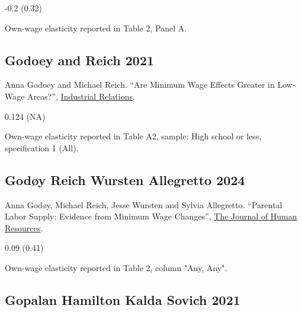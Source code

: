 \vspace{0.7em}

 -0.2 (0.32)

\vspace{0.7em}

 Own-wage elasticity reported in Table 2, Panel A.

\subsection*{Godoey and Reich 2021}
\vspace{-0.7em}

\noindent Anna Godoey and Michael Reich. ``Are Minimum Wage Effects Greater in Low-Wage Areas?'', \href{https://doi.org/10.1111/irel.12267}{Industrial Relations}.

\vspace{0.7em}

 0.124 (NA)

\vspace{0.7em}

 Own-wage elasticity reported in Table A2, sample: High school or less, specification 1 (All).

\subsection*{Godøy Reich Wursten Allegretto 2024}
\vspace{-0.7em}

\noindent Anna Godøy, Michael Reich, Jesse Wursten and Sylvia Allegretto. ``Parental Labor Supply: Evidence from Minimum Wage Changes'', \href{https://doi.org/10.3368/jhr.1119-10540R2}{The Journal of Human Resources}.

\vspace{0.7em}

 0.09 (0.41)

\vspace{0.7em}

 Own-wage elasticity reported in Table 2, column "Any, Any".

\subsection*{Gopalan Hamilton Kalda Sovich 2021}
\vspace{-0.7em}

